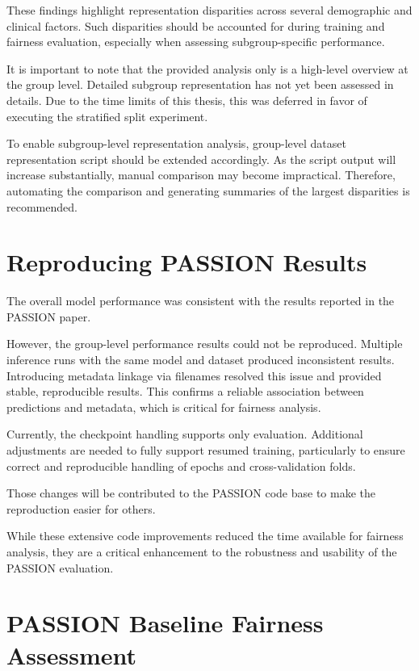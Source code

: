 \documentclass[12pt, a4paper, oneside]{book}   	%
\begin{document}
		These findings highlight representation disparities across several demographic and clinical factors. Such disparities should be accounted for during training and fairness evaluation, especially when assessing subgroup-specific performance.
		
		It is important to note that the provided analysis only is a high-level overview at the group level. Detailed subgroup representation has not yet been assessed in details. Due to the time limits of this thesis, this was deferred in favor of executing the stratified split experiment.
		
		To enable subgroup-level representation analysis, group-level dataset representation script should be extended accordingly. As the script output will increase substantially, manual comparison may become impractical. Therefore, automating the comparison and generating summaries of the largest disparities is recommended.
		
		
		\section{Reproducing PASSION Results}
		The overall model performance was consistent with the results reported in the PASSION paper.
		
		However, the group-level performance results could not be reproduced. Multiple inference runs with the same model and dataset produced inconsistent results. Introducing metadata linkage via filenames resolved this issue and provided stable, reproducible results. This confirms a reliable association between predictions and metadata, which is critical for fairness analysis.
		
		Currently, the checkpoint handling supports only evaluation. Additional adjustments are needed to fully support resumed training, particularly to ensure correct and reproducible handling of epochs and cross-validation folds.
		
		Those changes will be contributed to the PASSION code base to make the reproduction easier for others.
		
		While these extensive code improvements reduced the time available for fairness analysis, they are a critical enhancement to the robustness and usability of the PASSION evaluation.
		
		\section{PASSION Baseline Fairness Assessment} \label{sec:evaluation}
		
\end{document}
